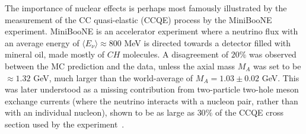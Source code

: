 %
The importance of nuclear effects is perhaps most famously illustrated by the measurement of the CC quasi-elastic (CCQE) process by the MiniBooNE~\cite{AguilarArevalo:2010zc} experiment. MiniBooNE is an accelerator experiment where a neutrino flux with an average energy of $\langle E_\nu \rangle \approx 800 $ MeV is directed towards a detector filled with mineral oil, made mostly of $CH$ molecules. A disagreement of $20\%$ was observed between the MC prediction and the data, unless the axial mass $M_A$ was set to be $\approx1.32$ GeV, much larger than the world-average of $M_A = 1.03 \pm 0.02$ GeV. This was later understood as a missing contribution from two-particle two-hole meson exchange currents (where the neutrino interacts with a nucleon pair, rather than with an individual nucleon), shown to be as large as $30\%$ of the CCQE cross section used by the experiment~\cite{Nieves:2011yp}.

